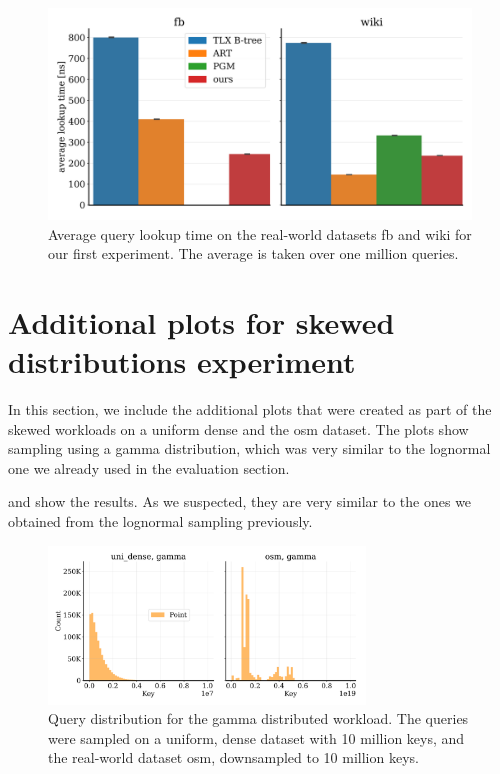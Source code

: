 \begin{figure}
    \centering
    \includegraphics[width=\textwidth]{figures/app_exp1_poc_times.pdf}
    \caption[fb and wiki lookup performance after sharp boundary sampling]{Average query lookup time on the real-world datasets fb and wiki for our first experiment. The average is taken over one million queries.}
    \label{fig:app_exp1_poc_times}
\end{figure}

\clearpage
\section{Additional plots for skewed distributions experiment}\label{app:skew}
In this section, we include the additional plots that were created as part of the skewed workloads on a uniform dense and the osm dataset. The plots show sampling using a gamma distribution, which was very similar to the lognormal one we already used in the evaluation section. \par

 and  show the results. As we suspected, they are very similar to the ones we obtained from the lognormal sampling previously.

\begin{figure}[ht]
    \centering
    \includegraphics[width=0.75\textwidth]{figures/app_exp2_query_dist.pdf}
    \caption[uniform and osm query distributions after gamma sampling]{Query distribution for the gamma distributed workload. The queries were sampled on a uniform, dense dataset with 10 million keys, and the real-world dataset osm, downsampled to 10 million keys.}
    \label{fig:app_exp2_query_dist}
\end{figure}

